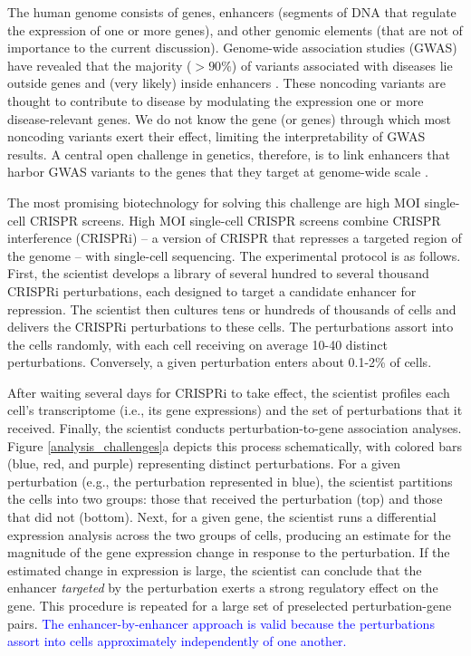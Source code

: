 \documentclass[12pt]{article}
\newcommand{\blue}[1]{\textcolor{blue}{#1}}
\begin{document}
The human genome consists of genes, enhancers (segments of DNA that regulate the expression of one or more genes), and other genomic elements (that are not of importance to the current discussion). Genome-wide association studies (GWAS) have revealed that the majority ($>90\%$) of variants associated with diseases lie outside genes and (very likely) inside enhancers \cite{Gallagher2018}. These noncoding variants are thought to contribute to disease by modulating the expression one or more disease-relevant genes. We do not know the gene (or genes) through which most noncoding variants exert their effect, limiting the interpretability of GWAS results. A central open challenge in genetics, therefore, is to link enhancers that harbor GWAS variants to the genes that they target at genome-wide scale \cite{Gasperini2020}.

The most promising biotechnology for solving this challenge are high MOI single-cell CRISPR screens. High MOI single-cell CRISPR screens combine CRISPR interference (CRISPRi) -- a version of CRISPR that represses a targeted region of the genome -- with single-cell sequencing. The experimental protocol is as follows. First, the scientist develops a library of several hundred to several thousand CRISPRi perturbations, each designed to target a candidate enhancer for repression. The scientist then cultures tens or hundreds of thousands of cells and delivers the CRISPRi perturbations to these cells. The perturbations assort into the cells randomly, with each cell receiving on average 10-40 distinct perturbations. Conversely, a given perturbation enters about 0.1-2\% of cells. 

After waiting several days for CRISPRi to take effect, the scientist profiles each cell's transcriptome (i.e., its gene expressions) and the set of perturbations that it received. Finally, the scientist conducts perturbation-to-gene association analyses. Figure \ref{analysis_challenges}a depicts this process schematically, with colored bars (blue, red, and purple) representing distinct perturbations. For a given perturbation (e.g., the perturbation represented in blue), the scientist partitions the cells into two groups: those that received the perturbation (top) and those that did not (bottom). Next, for a given gene, the scientist runs a differential expression analysis across the two groups of cells, producing an estimate for the magnitude of the gene expression change in response to the perturbation. If the estimated change in expression is large, the scientist can conclude that the enhancer \textit{targeted} by the perturbation exerts a strong regulatory effect on the gene. This procedure is repeated for a large set of preselected perturbation-gene pairs. \blue{The enhancer-by-enhancer approach is valid because the perturbations assort into cells approximately independently of one another.}
\end{document}
